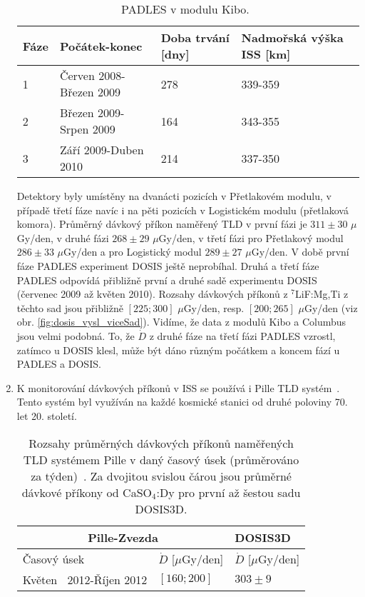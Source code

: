 \begin{enumerate}
	\begin{table}[ht]
	  \centering
	  \caption{PADLES v modulu Kibo.~\cite{japonsky}}
	  \label{tab:dosis_kibo}
	  \begin{tabular}{llll}
		\toprule
	Fáze&Počátek-konec&Doba trvání [dny]&Nadmořská výška ISS [km]\\
	\midrule
	1&Červen 2008-Březen 2009&278&339-359\\
	2&Březen 2009-Srpen 2009&164&343-355\\
	3&Září 2009-Duben 2010&214&337-350\\
	\bottomrule
	  \end{tabular}
	\end{table}
	Detektory byly umístěny na dvanácti pozicích v Přetlakovém modulu, v případě třetí fáze navíc i na pěti pozicích v Logistickém modulu (přetlaková komora). Průměrný dávkový příkon naměřený TLD v první fázi je $311\pm 30$ $\mu$Gy/den, v druhé fázi $268\pm29$ $\mu$Gy/den, v třetí fázi pro Přetlakový modul $286\pm33$ $\mu$Gy/den a pro Logistický modul $289\pm27$ $\mu$Gy/den. V době první fáze PADLES experiment DOSIS ještě neprobíhal. Druhá a třetí fáze PADLES odpovídá přibližně první a druhé sadě experimentu DOSIS (červenec 2009 až květen 2010). Rozsahy dávkových příkonů z $^7$LiF:Mg,Ti z těchto sad jsou přibližně $[225;300]$ $\mu$Gy/den, resp. $[200;265]$ $\mu$Gy/den (viz obr. \ref{fig:dosis_vysl_viceSad}). Vidíme, že data z modulů Kibo a Columbus jsou velmi podobná. To, že $\dot{D}$ z
	druhé fáze na třetí fázi PADLES vzrostl, zatímco u DOSIS klesl, může být dáno různým počátkem a koncem fází u PADLES a DOSIS. \cite{japonsky}
  \item K monitorování dávkových příkonů v ISS se používá i Pille TLD systém~\cite{pilleClanek}. Tento systém byl využíván na každé kosmické stanici od druhé poloviny 70. let 20. století.
	\begin{table}[ht]
	  \centering
	  \caption{Rozsahy průměrných dávkových příkonů naměřených TLD systémem Pille v daný časový úsek (průměrováno za týden)~\cite{pille, pille2}. Za dvojitou svislou čárou jsou průměrné dávkové příkony od CaSO$_4$:Dy pro první až šestou sadu DOSIS3D.}
	  \label{tab:dosis_pille}
	  \begin{tabular}{l|l||l}
		\toprule
		\multicolumn{2}{c||}{Pille-Zvezda}&DOSIS3D\\
		\midrule
		Časový úsek&$\dot{D}$ [$\mu$Gy/den]&$\dot{D}$ [$\mu$Gy/den]\\
		\midrule
		Květen $\ $ 2012-Říjen 2012&$[160;200]$&$303\pm9$	\\

\end{tabular}
\end{table}
\end{enumerate}
